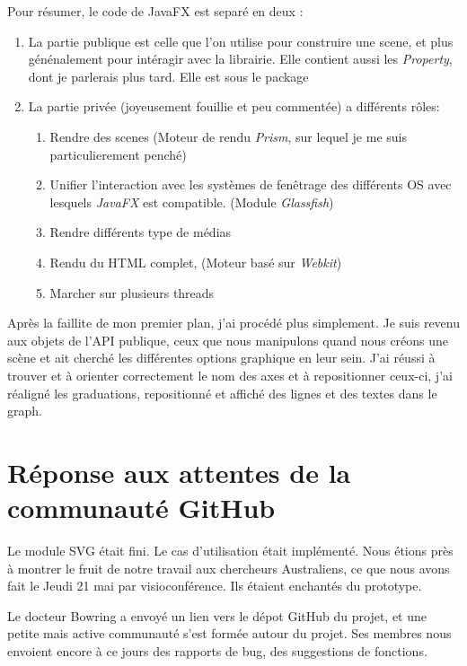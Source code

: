 Pour résumer, le code de JavaFX est separé en deux :
\begin{enumerate}
\item La partie publique est celle que l'on utilise pour construire une scene, et plus génénalement pour intéragir avec la librairie. Elle contient aussi les \textit{Property}, dont je parlerais plus tard. Elle est sous le package %
\item La partie privée (joyeusement fouillie et peu commentée) a différents rôles:%
  \begin{enumerate}	
  \item Rendre des scenes (Moteur de rendu \textit{Prism}, sur lequel je me suis particulierement penché)
  \item Unifier l'interaction avec les systèmes de fenêtrage des différents OS avec lesquels \textit{JavaFX} est compatible. (Module \textit{Glassfish})
  \item Rendre différents type de médias
  \item Rendu du HTML complet, (Moteur basé sur \textit{Webkit})
  \item Marcher sur plusieurs threads
  \end{enumerate}
\end{enumerate}

Après la faillite de mon premier plan, j'ai procédé plus simplement. Je suis revenu aux objets de l'API publique, ceux que nous manipulons quand nous créons une scène et ait cherché les différentes options graphique en leur sein. J'ai réussi à trouver et à orienter correctement le nom des axes et à repositionner ceux-ci, j'ai réaligné les graduations, repositionné et affiché des lignes et des textes dans le graph.

%
%
%
\section{Réponse aux attentes de la communauté GitHub}
Le module SVG était fini. Le cas d'utilisation était implémenté. Nous étions près à montrer le fruit de notre travail aux chercheurs Australiens, ce que nous avons fait le Jeudi%
21 mai par visioconférence. Ils étaient enchantés du prototype.

Le docteur Bowring a envoyé un lien vers le dépot GitHub du projet, et une petite mais active communauté s'est formée autour du projet. Ses membres nous envoient encore à ce jours des rapports de bug, des suggestions de fonctions.

